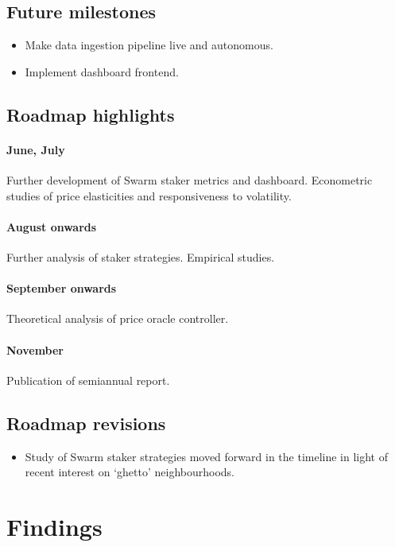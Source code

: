 \subsection*{Future milestones}

\begin{itemize}
  \item Make data ingestion pipeline live and autonomous.
  \item Implement dashboard frontend.
\end{itemize}


\subsection*{Roadmap highlights}

\paragraph{June, July} 
%
Further development of Swarm staker metrics and dashboard. 
%
Econometric studies of price elasticities and responsiveness to volatility.

\paragraph{August onwards}
%
Further analysis of staker strategies.
%
Empirical studies.

\paragraph{September onwards}
%
Theoretical analysis of price oracle controller.

\paragraph{November}
%
Publication of semiannual report.


\subsection*{Roadmap revisions}

\begin{itemize}
  \item Study of Swarm staker strategies moved forward in the timeline in light of recent interest on `ghetto' neighbourhoods.
\end{itemize}



\section*{Findings}

